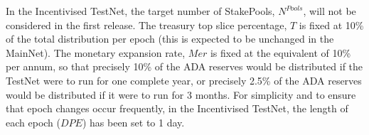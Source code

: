 \documentclass[11pt,a4paper,dvipsnames,twosided,final]{article}
\newcommand{\ada}{ADA{}}
\newcommand{\ADA}[1]{\textbf{\emph{\ada~{#1}}}}
\begin{document}
\noindent
In the Incentivised TestNet,
the target number of StakePools, $N^{\textit{Pools}}$, will not be considered in the first release.
The treasury top slice percentage, $T$ is fixed at 10\% of the total distribution per epoch (this is expected to be unchanged in the MainNet).
The monetary expansion rate, $\textit{Mer}$ is fixed at the equivalent of 10\% per annum, so that precisely 10\% of the \ada{} reserves would be distributed
if the TestNet were to run for one complete year, or precisely 2.5\% of the \ada{} reserves would be distributed if it were to run for 3 months.
For simplicity and to ensure that epoch changes occur frequently, in the Incentivised TestNet, the length of each epoch ($\textit{DPE}$) has been set to 1 day.


\end{document}

